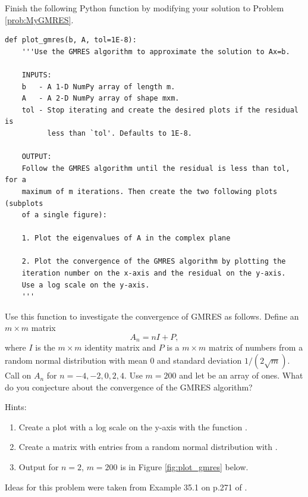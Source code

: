 \begin{problem}\label{prob:plot_gmres}
Finish the following Python function by modifying your solution to Problem \ref{prob:MyGMRES}.

\begin{lstlisting}
def plot_gmres(b, A, tol=1E-8):
    '''Use the GMRES algorithm to approximate the solution to Ax=b.
    
    INPUTS:
    b   - A 1-D NumPy array of length m.
    A   - A 2-D NumPy array of shape mxm.
    tol - Stop iterating and create the desired plots if the residual is
          less than `tol'. Defaults to 1E-8.
    
    OUTPUT:
    Follow the GMRES algorithm until the residual is less than tol, for a 
    maximum of m iterations. Then create the two following plots (subplots
    of a single figure):
     
    1. Plot the eigenvalues of A in the complex plane
    
    2. Plot the convergence of the GMRES algorithm by plotting the
    iteration number on the x-axis and the residual on the y-axis.
    Use a log scale on the y-axis.
    '''
\end{lstlisting}

Use this function to investigate the convergence of GMRES as follows. 
Define an $m\times m$ matrix
\[A_n = nI+P,\]
 where $I$ is the $m \times m$ identity matrix and $P$ is a $m \times m$ matrix of numbers from a random normal distribution with mean 0 and standard deviation $1/(2\sqrt{m})$. 
 Call  on $A_n$ for $n=-4,-2,0,2,4$. Use $m=200$ and let  be an array of ones. What do you conjecture about the convergence of the GMRES algorithm?
 
 Hints:
 \begin{enumerate}
 \item Create a plot with a log scale on the y-axis with the function .
 \item Create a matrix with entries from a random normal distribution with .
 \item Output for $n=2$, $m=200$ is in Figure \ref{fig:plot_gmres} below.
 \end{enumerate}
Ideas for this problem were taken from Example 35.1 on p.271 of \cite{Trefethen1997}.


\end{problem}
